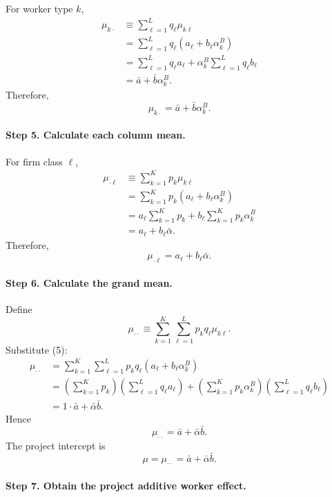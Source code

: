 \documentclass[11pt]{article}
\begin{document}
For worker type \(k\),
\begin{align*}
\mu_{k\cdot}
&\equiv
\sum_{\ell=1}^Lq_\ell\mu_{k\ell}\\
&=
\sum_{\ell=1}^Lq_\ell(a_\ell+b_\ell\alpha_k^B)\\
&=
\sum_{\ell=1}^Lq_\ell a_\ell
+
\alpha_k^B\sum_{\ell=1}^Lq_\ell b_\ell\\
&=
\bar a+\bar b\alpha_k^B.
\end{align*}
Therefore,
\[
\mu_{k\cdot}=\bar a+\bar b\alpha_k^B.
\tag{10}
\]

\paragraph{Step 5. Calculate each column mean.}

For firm class \(\ell\),
\begin{align*}
\mu_{\cdot\ell}
&\equiv
\sum_{k=1}^Kp_k\mu_{k\ell}\\
&=
\sum_{k=1}^Kp_k(a_\ell+b_\ell\alpha_k^B)\\
&=
a_\ell\sum_{k=1}^Kp_k
+
b_\ell\sum_{k=1}^Kp_k\alpha_k^B\\
&=
a_\ell+b_\ell\bar\alpha.
\end{align*}
Therefore,
\[
\mu_{\cdot\ell}=a_\ell+b_\ell\bar\alpha.
\tag{11}
\]

\paragraph{Step 6. Calculate the grand mean.}

Define
\[
\mu_{\cdot\cdot}
\equiv
\sum_{k=1}^K\sum_{\ell=1}^Lp_kq_\ell\mu_{k\ell}.
\tag{12}
\]
Substitute (5):
\begin{align*}
\mu_{\cdot\cdot}
&=
\sum_{k=1}^K\sum_{\ell=1}^L
p_kq_\ell(a_\ell+b_\ell\alpha_k^B)\\
&=
\left(\sum_{k=1}^Kp_k\right)
\left(\sum_{\ell=1}^Lq_\ell a_\ell\right)
+
\left(\sum_{k=1}^Kp_k\alpha_k^B\right)
\left(\sum_{\ell=1}^Lq_\ell b_\ell\right)\\
&=
1\cdot\bar a+\bar\alpha\bar b.
\end{align*}
Hence
\[
\mu_{\cdot\cdot}=\bar a+\bar\alpha\bar b.
\tag{13}
\]
The project intercept is
\[
\mu=\mu_{\cdot\cdot}=\bar a+\bar\alpha\bar b.
\tag{14}
\]

\paragraph{Step 7. Obtain the project additive worker effect.}
\end{document}
